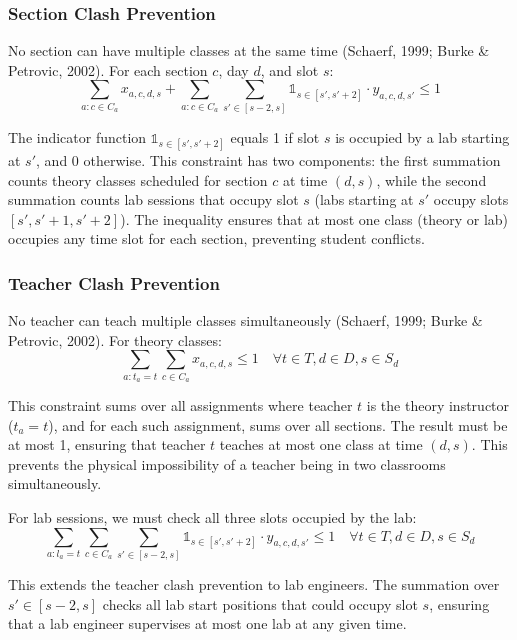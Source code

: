 \documentclass[12pt,a4paper]{article}
\begin{document}
\subsubsection{Section Clash Prevention}

No section can have multiple classes at the same time (Schaerf, 1999; Burke \& Petrovic, 2002). For each section $c$, day $d$, and slot $s$:
\begin{equation}
\sum_{a: c \in C_a} x_{a,c,d,s} + \sum_{a: c \in C_a} \sum_{s' \in [s-2, s]} \mathbb{1}_{s \in [s', s'+2]} \cdot y_{a,c,d,s'} \leq 1
\end{equation}

The indicator function $\mathbb{1}_{s \in [s', s'+2]}$ equals 1 if slot $s$ is occupied by a lab starting at $s'$, and 0 otherwise. This constraint has two components: the first summation counts theory classes scheduled for section $c$ at time $(d,s)$, while the second summation counts lab sessions that occupy slot $s$ (labs starting at $s'$ occupy slots $[s', s'+1, s'+2]$). The inequality ensures that at most one class (theory or lab) occupies any time slot for each section, preventing student conflicts.

\subsubsection{Teacher Clash Prevention}

No teacher can teach multiple classes simultaneously (Schaerf, 1999; Burke \& Petrovic, 2002). For theory classes:
\begin{equation}
\sum_{a: t_a = t} \sum_{c \in C_a} x_{a,c,d,s} \leq 1 \quad \forall t \in T, d \in D, s \in S_d
\end{equation}

This constraint sums over all assignments where teacher $t$ is the theory instructor ($t_a = t$), and for each such assignment, sums over all sections. The result must be at most 1, ensuring that teacher $t$ teaches at most one class at time $(d,s)$. This prevents the physical impossibility of a teacher being in two classrooms simultaneously.

For lab sessions, we must check all three slots occupied by the lab:
\begin{equation}
\sum_{a: l_a = t} \sum_{c \in C_a} \sum_{s' \in [s-2, s]} \mathbb{1}_{s \in [s', s'+2]} \cdot y_{a,c,d,s'} \leq 1 \quad \forall t \in T, d \in D, s \in S_d
\end{equation}

This extends the teacher clash prevention to lab engineers. The summation over $s' \in [s-2, s]$ checks all lab start positions that could occupy slot $s$, ensuring that a lab engineer supervises at most one lab at any given time.
\end{document}
